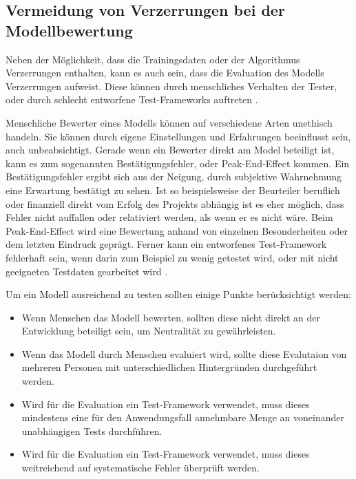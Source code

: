 \documentclass[12pt]{report}
\begin{document}
\subsection{Vermeidung von Verzerrungen bei der Modellbewertung}
Neben der Möglichkeit, dass die Trainingsdaten oder der Algorithmus Verzerrungen enthalten, kann es auch sein, dass die Evaluation des Modells Verzerrungen aufweist.
Diese können durch menschliches Verhalten der Tester, oder durch schlecht entworfene Test-Frameworks auftreten \cite[S. 54f.]{Srinivasan}.

Menschliche Bewerter eines Modells können auf verschiedene Arten unethisch handeln. Sie können durch eigene Einstellungen und Erfahrungen beeinflusst sein, auch unbeabsichtigt.
Gerade wenn ein Bewerter direkt am Model beteiligt ist, kann es zum sogenannten Bestätigungsfehler, oder \glqq Peak-End-Effect\grqq{} kommen. Ein Bestätigungsfehler ergibt sich aus der Neigung, durch subjektive Wahrnehmung eine Erwartung bestätigt zu sehen. Ist so beispielsweise der Beurteiler beruflich oder finanziell direkt vom Erfolg des Projekts abhängig ist es eher möglich, dass Fehler nicht auffallen oder relativiert werden, als wenn er es nicht wäre.
Beim \glqq Peak-End-Effect\grqq{} wird eine Bewertung anhand von einzelnen Besonderheiten oder dem letzten Eindruck geprägt.
Ferner kann ein entworfenes Test-Framework fehlerhaft sein, wenn darin zum Beispiel zu wenig getestet wird, oder mit nicht geeigneten Testdaten gearbeitet wird \cite[S. 54f.]{Srinivasan}.

Um ein Modell ausreichend zu testen sollten einige Punkte berücksichtigt werden: %
\begin{itemize}
    \item Wenn Menschen das Modell bewerten, sollten diese nicht direkt an der Entwicklung beteiligt sein, um Neutralität zu gewährleisten.
    \item Wenn das Modell durch Menschen evaluiert wird, sollte diese Evalutaion von mehreren Personen mit unterschiedlichen Hintergründen durchgeführt werden.
    \item Wird für die Evaluation ein Test-Framework verwendet, muss dieses mindestens eine für den Anwendungsfall annehmbare Menge an voneinander unabhängigen Tests durchführen.
    \item Wird für die Evaluation ein Test-Framework verwendet, muss dieses weitreichend auf systematische Fehler überprüft werden.
\end{itemize}
\end{document}

